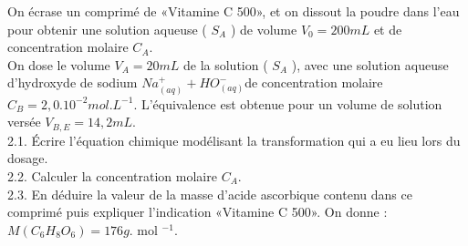 On écrase un comprimé de «Vitamine C 500», et on dissout la poudre dans l'eau pour obtenir une solution aqueuse ( $S_{A}$ ) de volume $V_{0}=200 m L$ et de concentration molaire $C_{A}$.\\
On dose le volume $V_{A}=20 m L$ de la solution ( $S_{A}$ ), avec une solution aqueuse d'hydroxyde de sodium $N a_{(a q)}^{+}+H O_{(a q)}^{-}$de concentration molaire $C_{B}=2,0.10^{-2} m o l . L^{-1}$. L'équivalence est obtenue pour un volume de solution versée $V_{B, E}=14,2 m L$.\\
2.1. Écrire l'équation chimique modélisant la transformation qui a eu lieu lors du dosage.\\
2.2. Calculer la concentration molaire $C_{A}$.\\
2.3. En déduire la valeur de la masse d'acide ascorbique contenu dans ce comprimé puis expliquer l'indication «Vitamine C 500». On donne : $M\left(C_{6} H_{8} O_{6}\right)=176 g$. mol $^{-1}$.


